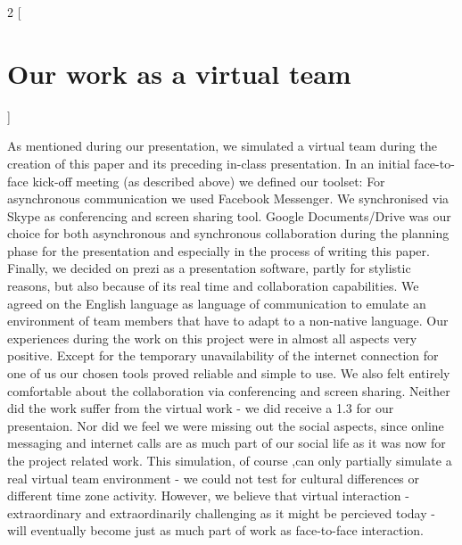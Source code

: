 \begin{multicols}{2}
[\section{Our work as a virtual team}]

As mentioned during our presentation, we simulated a virtual team during the creation of this paper and its preceding in-class presentation. In an initial face-to-face kick-off meeting (as described above) we defined our toolset: For asynchronous communication we used Facebook Messenger. We synchronised via Skype as conferencing and screen sharing tool. Google Documents/Drive was our choice for both asynchronous and synchronous collaboration during the planning phase for the presentation and especially in the process of writing this paper. Finally, we decided on prezi as a presentation software, partly for stylistic reasons, but also because of its real time and collaboration capabilities. We agreed on the English language as language of communication to emulate an environment of team members that have to adapt to a non-native language.
Our experiences during the work on this project were in almost all aspects very positive. Except for the temporary unavailability of the internet connection for one of us our chosen tools proved reliable and simple to use. We also felt entirely comfortable about the collaboration via conferencing and screen sharing. Neither did the work suffer from the virtual work - we did receive a 1.3 for our presentaion. Nor did we feel we were missing out the social aspects, since online messaging and internet calls are as much part of our social life as it was now for the project related work.
This simulation, of course ,can only partially simulate a real virtual team environment - we could not test for cultural differences or different time zone activity. However, we believe that virtual interaction - extraordinary and extraordinarily challenging as it might be percieved today - will eventually become just as much part of work as face-to-face interaction.

\end{multicols}